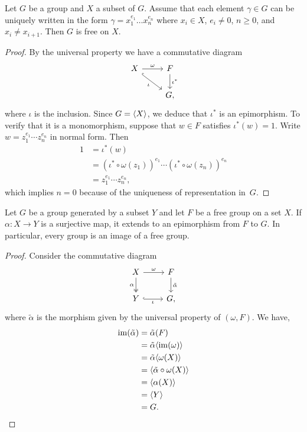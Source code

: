 \begin{prop}
    Let\/ $G$ be a group and\/ $X$ a subset of\/ $G$. Assume that each element\/ $\gamma\in G$ can be uniquely written in the form\/ $\gamma = x_1^{e_1}\dots x_n^{e_n}$ where\/ $x_i \in X$, $e_i \neq 0$, $n \ge 0$, and\/ $x_i \neq x_{i+1}$. Then\/ $G$ is free on\/ $X$.
\end{prop}

\begin{proof} By the universal property we have a commutative diagram
    $$
        \begin{tikzcd}
            X
                    \arrow[rd,"\iota"',hook]
                    \arrow[r,"\omega"]
                &F
                    \arrow[d,"\iota^*"]\\
                &G,
        \end{tikzcd}
    $$
    where $\iota$ is the inclusion. Since $G=\langle X\rangle$, we deduce that $\iota^*$ is an epimorphism. To verify that it is a monomorphism, suppose that $w\in F$ satisfies $\iota^*(w)=1$. Write $w=z_1^{e_1}\cdots z_n^{e_n}$ in normal form. Then
    \begin{align*}
        1 &= \iota^*(w)\\
            &= (\iota^*\circ\omega(z_1))^{e_1}\cdots
                (\iota^*\circ\omega(z_n))^{e_n}\\
            &= z_1^{e_1}\cdots z_n^{e_n},
    \end{align*}
    which implies $n=0$ because of the uniqueness of representation in~$G$.
\end{proof}

\begin{thm}\label{free-presentation-thm}
    Let\/ $G$ be a group generated by a subset\/ $Y$ and let\/ $F$ be a free group on a set\/ $X$. If\/ $\alpha\colon X \to Y$ is a surjective map, it extends to an epimorphism from\/ $F$ to\/ $G$. In particular, every group is an image of a free group.
\end{thm}

\begin{proof}
    Consider the commutative diagram
    $$
        \begin{tikzcd}
            X\arrow[d,"\alpha"',two heads]\arrow[r,"\omega"]
                &F\arrow[d,"\tilde\alpha"]\\
            Y\arrow[r,"\iota"',hook]
                &G,
        \end{tikzcd}
    $$
    where $\tilde\alpha$ is the morphism given by the universal property of $(\omega, F)$. We have,
    \begin{align*}
        \operatorname{im}(\tilde\alpha) &= \tilde\alpha(F)\\
            &= \tilde\alpha\langle\operatorname{im}(\omega)\rangle\\
            &= \tilde\alpha\langle\omega(X)\rangle\\
            &= \langle\tilde\alpha\circ\omega(X)\rangle\\
            &= \langle\alpha(X)\rangle\\
            &= \langle Y\rangle\\
            &= G.
    \end{align*}
\end{proof}

